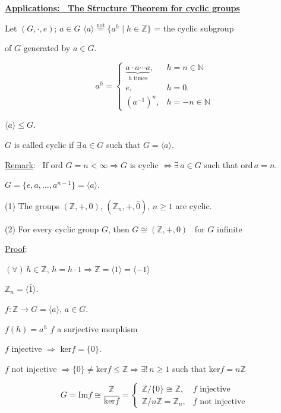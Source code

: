 \documentclass[12pt]{article}
\begin{document}
\noindent\underline{\textbf{Applications: \ The Structure Theorem for cyclic groups}}

\bigskip
\noindent Let $(G,\cdot,e)$; $a\in G$ \quad $\langle a\rangle \overset{\text{not}}{=} \{a^h \mid h\in\mathbb{Z}\}$ = the cyclic subgroup

\noindent of $G$ generated by $a\in G$.

\[
a^h =
\begin{cases}
\underbrace{a\cdot a\cdots a}_{h \text{ times}}, & h=n\in\mathbb{N} \\
e, & h=0. \\
(a^{-1})^n, & h=-n\in\mathbb{N}
\end{cases}
\]

\noindent $\langle a\rangle \leq G$.

\bigskip
\noindent $G$ is called cyclic if $\exists\,a\in G$ such that $G=\langle a\rangle$.

\bigskip
\noindent\underline{Remark}: \ If ord $G=n<\infty \Rightarrow G$ is cyclic $\Leftrightarrow \exists\,a\in G$ such that ord$\,a=n$.

\noindent $G=\{e,a,\ldots,a^{n-1}\} = \langle a\rangle$.

\bigskip
\noindent (1) The groups $(\mathbb{Z},+,0)$, $(\mathbb{Z}_n,+,\hat 0)$, $n\geq 1$ are cyclic.

\noindent (2) For every cyclic group $G$, then $G\cong (\mathbb{Z},+,0)$ \ for $G$ infinite

\bigskip
\noindent\underline{Proof}:

\noindent $(\forall)\,h\in\mathbb{Z}$, $h=h\cdot 1 \Rightarrow \mathbb{Z} = \langle 1\rangle = \langle -1\rangle$

\noindent $\mathbb{Z}_n = \langle\hat 1\rangle$.

\bigskip
\noindent $f: \mathbb{Z}\to G=\langle a\rangle$, $a\in G$.

\noindent $f(h)=a^h$ \quad $f$ a surjective morphism

\bigskip
\noindent $f$ injective $\Rightarrow$ ker$f=\{0\}$.

\noindent $f$ not injective $\Rightarrow \{0\}\neq\text{ker}f\leq\mathbb{Z} \Rightarrow \exists!\,n\geq 1$ such that ker$f=n\mathbb{Z}$

\[
G=\text{Im}f \cong \frac{\mathbb{Z}}{\text{ker}f} =
\begin{cases}
\mathbb{Z}/\{0\} \cong \mathbb{Z}, & f \text{ injective}\\
\mathbb{Z}/n\mathbb{Z} = \mathbb{Z}_n, & f \text{ not injective}
\end{cases}
\]
\end{document}
